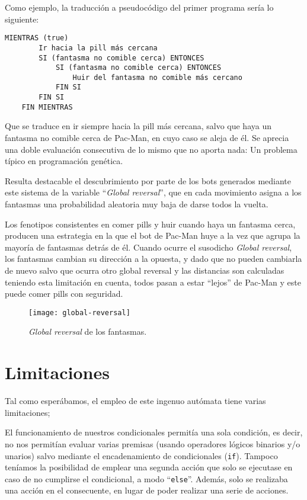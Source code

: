 Como ejemplo, la traducción a pseudocódigo del primer programa sería lo siguiente:
\begin{lstlisting}[frame=single, breaklines=no, basicstyle=\fontsize{10}{11}\ttfamily]
    MIENTRAS (true)
        Ir hacia la pill más cercana
        SI (fantasma no comible cerca) ENTONCES
            SI (fantasma no comible cerca) ENTONCES
                Huir del fantasma no comible más cercano
            FIN SI
        FIN SI
    FIN MIENTRAS
\end{lstlisting}

Que se traduce en ir siempre hacia la pill más cercana, salvo que haya un fantasma no comible cerca de Pac-Man, en cuyo caso se aleja de él. Se aprecia una doble evaluación consecutiva de lo mismo que no aporta nada: Un problema típico en programación genética. 

\blankline

Resulta destacable el descubrimiento por parte de los bots generados mediante este sistema de la variable ``\textit{Global reversal}'', que en cada movimiento asigna a los fantasmas una probabilidad aleatoria muy baja de darse todos la vuelta.
 
Los fenotipos consistentes en comer pills y huir cuando haya un fantasma cerca, producen una estrategia en la que el bot de Pac-Man huye a la vez que agrupa la mayoría de fantasmas detrás de él. Cuando ocurre el susodicho \textit{Global reversal}, los fantasmas cambian su dirección a la opuesta, y dado que no pueden cambiarla de nuevo salvo que ocurra otro global reversal y las distancias son calculadas teniendo esta limitación en cuenta, todos pasan a estar ``lejos'' de Pac-Man y este puede comer pills con seguridad.
\begin{figure}[H]
\centering
\texttt{[image: global-reversal]}
\caption{\textit{Global reversal} de los fantasmas.}
\end{figure}

\section{Limitaciones}
Tal como esperábamos, el empleo de este ingenuo autómata tiene varias limitaciones;
 
El funcionamiento de nuestros condicionales permitía una sola condición, es decir, no nos permitían evaluar varias premisas (usando operadores lógicos binarios y/o unarios) salvo mediante el encadenamiento de condicionales (\texttt{if}). 
Tampoco teníamos la posibilidad de emplear una segunda acción que solo se ejecutase en caso de no cumplirse el condicional, a modo ``\texttt{else}''. Además, solo se realizaba una acción en el consecuente, en lugar de poder realizar una serie de acciones. 
 

